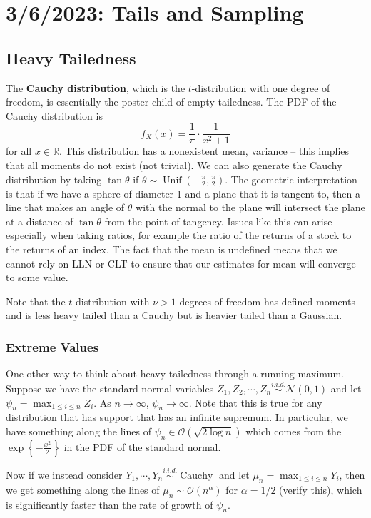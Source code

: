 \chapter{3/6/2023: Tails and Sampling}
\section{Heavy Tailedness}
The \textbf{Cauchy distribution}, which is the $t$-distribution with one degree of freedom, is essentially the poster child of empty tailedness. The PDF of the Cauchy distribution is $$f_X(x) = \frac{1}{\pi}\cdot\frac{1}{x^2+1}$$ for all $x\in\mathbb R$. This distribution has a nonexistent mean, variance -- this implies that all moments do not exist (not trivial). We can also generate the Cauchy distribution by taking $\tan\theta$ if $\theta\sim\operatorname{Unif}\left(-\frac{\pi}{2},\frac{\pi}{2}\right)$. The geometric interpretation is that if we have a sphere of diameter 1 and a plane that it is tangent to, then a line that makes an angle of $\theta$ with the normal to the plane will intersect the plane at a distance of $\tan\theta$ from the point of tangency. Issues like this can arise especially when taking ratios, for example the ratio of the returns of a stock to the returns of an index. The fact that the mean is undefined means that we cannot rely on LLN or CLT to ensure that our estimates for mean will converge to some value.

Note that the $t$-distribution with $\nu>1$ degrees of freedom has defined moments and is less heavy tailed than a Cauchy but is heavier tailed than a Gaussian.

\subsection{Extreme Values}
One other way to think about heavy tailedness through a running maximum. Suppose we have the standard normal variables $Z_1,Z_2,\cdots,Z_n\overset{i.i.d.}{\sim}\mathcal N(0,1)$ and let $\psi_n=\max_{1\leq i\leq n} Z_i$. As $n\to\infty$, $\psi_n\to\infty$. Note that this is true for any distribution that has support that has an infinite supremum. In particular, we have something along the lines of $\psi_n\in\mathcal O(\sqrt{2\log n})$ which comes from the $\exp\left\{-\frac{x^2}{2}\right\}$ in the PDF of the standard normal.

Now if we instead consider $Y_1,\cdots,Y_n\overset{i.i.d.}{\sim}\operatorname{Cauchy}$ and let $\mu_n=\max_{1\leq i\leq n} Y_i$, then we get something along the lines of $\mu_n\sim\mathcal O(n^\alpha)$ for $\alpha=1/2$ (verify this), which is significantly faster than the rate of growth of $\psi_n$.

